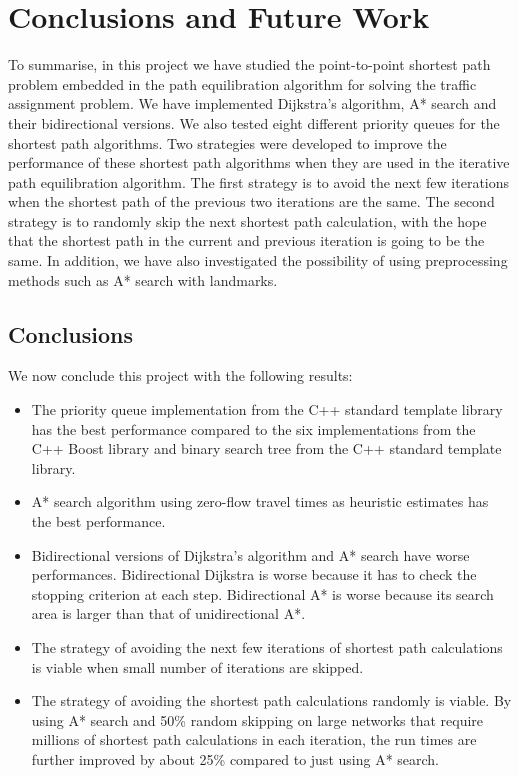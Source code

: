 \chapter{Conclusions and Future Work} \label{chap:conclusions}
To summarise,
in this project we have studied the point-to-point shortest path problem embedded in the path equilibration algorithm for solving the traffic assignment problem.
We have implemented Dijkstra's algorithm, A* search and their bidirectional versions.
We also tested eight different priority queues for the shortest path algorithms.
Two strategies were developed to improve the performance of these shortest path algorithms when they are used in the iterative path equilibration algorithm.
The first strategy is to avoid the next few iterations
when the shortest path of the previous two iterations are the same.
The second strategy is to randomly skip the next shortest path calculation,
with the hope that the shortest path in the current and previous iteration is going to be the same.
In addition,
we have also investigated the possibility of using preprocessing methods such as A* search with landmarks.

\section{Conclusions}
We now conclude this project with the following results:
\begin{itemize}
    \item The priority queue implementation from the C++ standard template library has the best performance compared to the six implementations from the C++ Boost library and binary search tree from the C++ standard template library.
    \item A* search algorithm using zero-flow travel times as heuristic estimates has the best performance.
    \item Bidirectional versions of Dijkstra's algorithm and A* search have worse performances. Bidirectional Dijkstra is worse because it has to check the stopping criterion at each step. Bidirectional A* is worse because its search area is larger than that of unidirectional A*.
    \item The strategy of avoiding the next few iterations of shortest path calculations is viable when small number of iterations are skipped.
    \item The strategy of avoiding the shortest path calculations randomly is viable. By using A* search and 50\% random skipping on large networks that require millions of shortest path calculations in each iteration, the run times are further improved by about 25\% compared to just using A* search.
\end{itemize}

